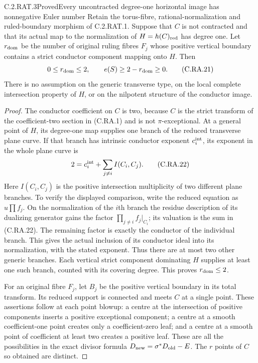 \begin{statement}{C.2.RAT.3}{Proved}{Every uncontracted degree-one horizontal image has nonnegative Euler number}
Retain the torus-fibre, rational-normalization and ruled-boundary
morphism of C.2.RAT.1. Suppose that $C$ is not contracted and
that its actual map to the normalization of
$H=h(C)_{\rm red}$ has degree one. Let $r_{\rm dom}$ be the
number of original ruling fibres $F_j$ whose positive vertical
boundary contains a strict conductor component mapping onto
$H$. Then
\[
       0\le r_{\rm dom}\le2,\qquad
       e(S)\ge2-r_{\rm dom}\ge0.
\tag{C.RA.21}
\]
There is no assumption on the generic transverse type, on the
local complete intersection property of $H$, or on the
nilpotent structure of the conductor image.
\end{statement}
\begin{proof}
The conductor coefficient on $C$ is two, because $C$ is
the strict transform of the coefficient-two section in
(C.RA.1) and is not $\pi$-exceptional. At a general point
of $H$, its degree-one map supplies one branch of the reduced
transverse plane curve. If that branch has intrinsic
conductor exponent $c_i^{\rm int}$, its exponent in the
whole plane curve is
\[
             2=c_i^{\rm int}+\sum_{j\ne i}I(C_i,C_j).
\tag{C.RA.22}
\]
Here $I(C_i,C_j)$ is the positive intersection multiplicity
of two different plane branches. To verify the displayed
comparison, write the reduced equation as $u\prod f_j$.
On the normalization of the $i$th branch the residue
description of its dualizing generator gains the factor
$\prod_{j\ne i}f_j|_{C_i}$; its valuation is the sum in
(C.RA.22). The remaining factor is exactly the conductor
of the individual branch. This gives the actual inclusion
of its conductor ideal into its normalization, with the
stated exponent. Thus there are at most two other generic
branches. Each vertical strict component dominating $H$
supplies at least one such branch, counted with its covering
degree. This proves $r_{\rm dom}\le2$.

For an original fibre $F_j$, let $B_j$ be the positive
vertical boundary in its total transform. Its reduced
support is connected and meets $C$ at a single point.
These assertions follow at each point blowup: a centre
at the intersection of positive components inserts a
positive exceptional component; a centre at a smooth
coefficient-one point creates only a coefficient-zero
leaf; and a centre at a smooth point of coefficient
at least two creates a positive leaf. These are all the
possibilities in the exact divisor formula
$D_{\rm new}=\sigma^*D_{\rm old}-E$.
The $r$ points of $C$ so obtained are distinct.


\end{proof}
